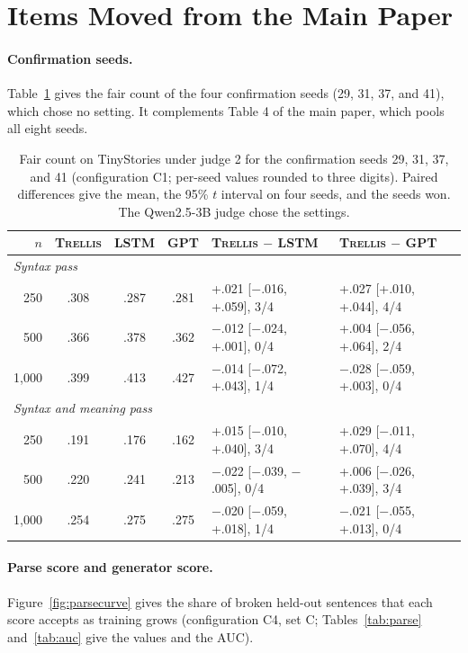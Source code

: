 \documentclass[11pt,letterpaper]{article}
\newcommand{\trellis}{\textsc{Trellis}}
\begin{document}
\section{Items Moved from the Main Paper}

\paragraph{Confirmation seeds.} Table~\ref{tab:genconf} gives the fair count of the four confirmation seeds (29, 31, 37, and 41), which chose no setting. It complements Table 4 of the main paper, which pools all eight seeds.

\begin{table}[h]
\caption{Fair count on TinyStories under judge 2 for the confirmation seeds 29, 31, 37, and 41 (configuration C1; per-seed values rounded to three digits). Paired differences give the mean, the 95\% $t$ interval on four seeds, and the seeds won. The Qwen2.5-3B judge chose the settings.}
\label{tab:genconf}
\begin{center}
\footnotesize
\begin{tabular}{rcccll}
\toprule
$n$ & \trellis{} & LSTM & GPT & \trellis{} $-$ LSTM & \trellis{} $-$ GPT \\
\midrule
\multicolumn{6}{l}{\textit{Syntax pass}} \\
250   & .308 & .287 & .281 & +.021 [$-$.016, +.059], 3/4 & +.027 [+.010, +.044], 4/4 \\
500   & .366 & .378 & .362 & $-$.012 [$-$.024, +.001], 0/4 & +.004 [$-$.056, +.064], 2/4 \\
1,000 & .399 & .413 & .427 & $-$.014 [$-$.072, +.043], 1/4 & $-$.028 [$-$.059, +.003], 0/4 \\
\multicolumn{6}{l}{\textit{Syntax and meaning pass}} \\
250   & .191 & .176 & .162 & +.015 [$-$.010, +.040], 3/4 & +.029 [$-$.011, +.070], 4/4 \\
500   & .220 & .241 & .213 & $-$.022 [$-$.039, $-$.005], 0/4 & +.006 [$-$.026, +.039], 3/4 \\
1,000 & .254 & .275 & .275 & $-$.020 [$-$.059, +.018], 1/4 & $-$.021 [$-$.055, +.013], 0/4 \\
\bottomrule
\end{tabular}
\end{center}
\end{table}

\paragraph{Parse score and generator score.} Figure~\ref{fig:parsecurve} gives the share of broken held-out sentences that each score accepts as training grows (configuration C4, set C; Tables~\ref{tab:parse} and~\ref{tab:auc} give the values and the AUC).
\end{document}
